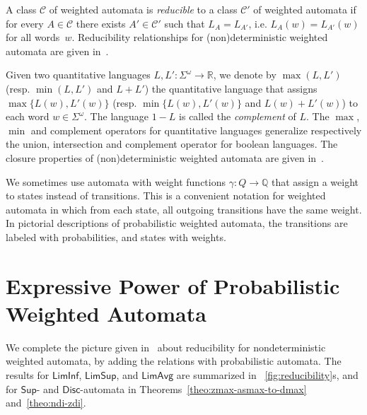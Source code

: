 \documentclass{llncs}
\newcommand{\rat}{{\mathbb Q}}
\newcommand{\real}{{\mathbb R}}
\newcommand{\C}{\mathcal{C}}
\newcommand{\Max}{\mathsf{Sup}}
\newcommand{\LimSup}{\mathsf{LimSup}}
\newcommand{\LimInf}{\mathsf{LimInf}}
\newcommand{\LimAvg}{\mathsf{LimAvg}}
\newcommand{\Disc}{\mathsf{Disc}}
\newcommand{\weight}{\gamma}
\begin{document}
\smallskip{} 
A class $\C$ of weighted automata is \emph{reducible}
to a class $\C'$ of weighted automata if for every $A \in \C$ there exists 
$A' \in \C'$ such that $L_A=L_{A'}$, i.e. $L_{A}(w)=L_{A'}(w)$ for all words~$w$.
Reducibility relationships for (non)deterministic weighted automata
are given in~\cite{CDH08a}.

\smallskip{} 
Given two quantitative languages $L, L': \Sigma^{\omega} \to \real$,
we denote by $\max(L,L')$ (resp. $\min(L,L')$ and $L+L'$)    the quantitative language that assigns $\max\{L(w),L'(w)\}$
(resp. $\min\{L(w),L'(w)\}$ and $L(w) + L'(w)$)     to each word $w \in \Sigma^{\omega}$. 
The language $1-L$ is called the \emph{complement} of $L$.
The $\max$, $\min$ and complement operators for quantitative languages 
generalize respectively the union, intersection and complement 
operator for boolean languages. 
The closure properties of (non)deterministic weighted automata are given in~\cite{CDH08b}.

\smallskip{} 
We sometimes use automata with weight functions $\weight: Q \to \rat$ that 
assign a weight to states instead of transitions. This is a convenient notation
for weighted automata in which from each state, all outgoing transitions 
have the same weight. In pictorial descriptions of probabilistic weighted
automata, the transitions are labeled with probabilities, and states with weights.


\section{Expressive Power of Probabilistic Weighted Automata}


We complete the picture given in~\cite{CDH08a} about reducibility for nondeterministic weighted automata,
by adding the relations with probabilistic automata. 
The results for $\LimInf$, $\LimSup$, and $\LimAvg$ are summarized in \figurename~\ref{fig:reducibility}s, and
for $\Max$- and $\Disc$-automata in Theorems~\ref{theo:zmax-asmax-to-dmax} and~\ref{theo:ndi-zdi}.
\end{document}
